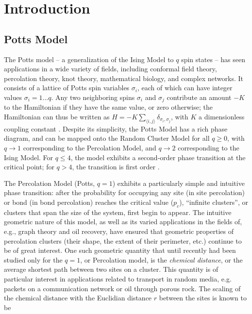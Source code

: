 \documentclass[pre,preprint,11pt]{revtex4}
\newcommand{\lb}{{\langle}}
\newcommand{\rb}{{\rangle}}
\begin{document}
\section{Introduction}
\subsection{ Potts Model} 

The Potts model -- a generalization of the Ising Model to $q$ spin states -- has seen applications in a wide variety of fields, including conformal field theory, percolation theory, knot theory, mathematical biology, and complex networks. It consists of a lattice of Potts spin variables $ \sigma_i $, each of which can have integer values $\sigma_i = 1 ... q$.  Any two neighboring spins $ \sigma_i $ and $ \sigma_j$ contribute an amount $-K$ to the Hamiltonian if they have the same value, or zero otherwise; the Hamiltonian can thus be written as $H=-K \displaystyle\sum_{\lb i,j \rb} \delta_{\sigma_i, \sigma_j}$, with $K$ a dimensionless coupling constant \cite{Wu82}.  Despite its simplicity, the Potts Model has a rich phase diagram, and can be mapped onto the Random Cluster Model for all $q \ge 0$, with  $q \to 1$ corresponding to the Percolation Model, and $q \to 2$ corresponding to the Ising Model.  For $q \le 4$, the model exhibits a second-order phase transition at the critical point; for $q>4$, the transition is first order \cite{Bax}. 

The Percolation Model (Potts, $q=1$) exhibits a particularly simple and intuitive phase transition:  after the probability for occupying any site (in site percolation) or bond (in bond percolation) reaches the critical value ($p_c$), ``infinite clusters'', or clusters that span the size of the system, first begin to appear.  The intuitive geometric nature of this model, as well as its varied applications in the fields of, e.g., graph theory and oil recovery, have ensured that geometric properties of percolation clusters (their shape, the extent of their perimeter, etc.) continue to be of great interest.  One such geometric quantity that until recently \cite{Deng2010} had been studied only for the $q = 1$, or Percolation model, is the {\it chemical distance}, or the average shortest path between two sites on a cluster.  This quantity is of particular interest in applications related to transport in random media, e.g. packets on a communication network or oil through porous rock. The scaling of the chemical distance with the Euclidian distance $r$ between the sites is known to be 
\end{document}
